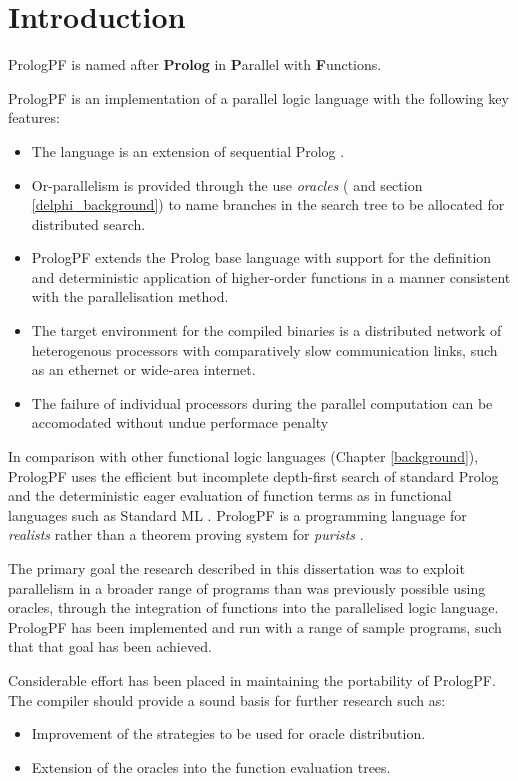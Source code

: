 \chapter{Introduction}
\label{intro}

PrologPF is named after \textbf{Prolog} in \textbf{P}arallel with
\textbf{F}unctions.

PrologPF is an implementation of a parallel logic language with the
following key features:
\begin{itemize}
\item{The language is an extension of sequential Prolog \cite{CM87}.}
\item{Or-parallelism is provided through the use \textit{oracles} 
  (\cite{CA87} and section \ref{delphi_background}) to name branches
  in the search tree to be allocated for distributed search.}
\item{PrologPF extends the Prolog base language with
  support for the definition and deterministic
  application of higher-order functions
  in a manner consistent with the parallelisation method.}
\item{The target environment for the compiled binaries is a distributed
  network of heterogenous processors with comparatively slow communication
  links, such as an ethernet or wide-area internet.}
\item{The failure of individual processors during the parallel computation
  can be accomodated without undue performace penalty}
\end{itemize}

In comparison with other functional logic languages (Chapter \ref{background}),
PrologPF uses the
efficient but
incomplete depth-first search of standard Prolog and the deterministic
eager evaluation of function terms as in functional languages such as
Standard ML \cite{MTH90}.  PrologPF is a programming language for
\textit{realists} rather than 
a theorem proving system for \textit{purists} \cite{PS91}.

The primary goal the research described in this dissertation was to
exploit parallelism in a broader range of programs than was previously
possible using oracles, through the integration of functions into the
parallelised logic language.  PrologPF has been implemented and run with
a range of sample programs, such that that goal has been
achieved.

Considerable effort has been placed in maintaining the
portability of PrologPF.  The compiler
should provide a sound basis for further research such as:
\begin{itemize}
\item{Improvement of the strategies to
  be used for oracle distribution.}
\item{Extension of the oracles into
  the function evaluation trees.}
\end{itemize}

